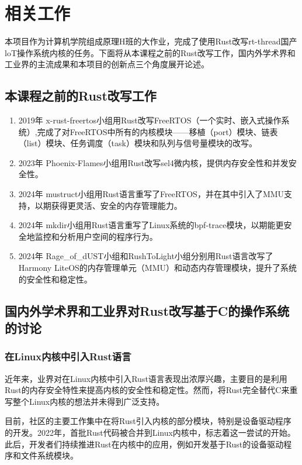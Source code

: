 \section{相关工作}

本项目作为计算机学院组成原理H班的大作业，完成了使用Rust改写rt-thread国产loT操作系统内核的任务。下面将从本课程之前的Rust改写工作，国内外学术界和工业界的主流成果和本项目的创新点三个角度展开论述。

\subsection{本课程之前的Rust改写工作}

\begin{enumerate}
  \item 2019年 x-rust-freertos小组用Rust改写FreeRTOS（一个实时、嵌入式操作系统）,完成了对FreeRTOS中所有的内核模块——移植（port）模块、链表（list）模块、任务调度（task）模块和队列与信号量模块的改写。
  \item 2023年 Phoenix-Flames小组用Rust改写sel4微内核，提供内存安全性和并发安全性。
  \item 2024年 mustruct小组用Rust语言重写了FreeRTOS，并在其中引入了MMU支持，以期获得更灵活、安全的内存管理能力。
  \item 2024年 mkdir小组用Rust语言重写了Linux系统的bpf-trace模块，以期能更安全地监控和分析用户空间的程序行为。
  \item 2024年 Rage\_of\_dUST小组和RushToLight小组分别用Rust语言改写了Harmony LiteOS的内存管理单元（MMU）和动态内存管理模块，提升了系统的安全性和稳定性。
\end{enumerate}

\subsection{国内外学术界和工业界对Rust改写基于C的操作系统的讨论}

\subsubsection{在Linux内核中引入Rust语言}

近年来，业界对在Linux内核中引入Rust语言表现出浓厚兴趣，主要目的是利用Rust的内存安全特性来提高内核的安全性和稳定性。然而，将Rust完全替代C来重写整个Linux内核的想法并未得到广泛支持。

目前，社区的主要工作集中在将Rust引入内核的部分模块，特别是设备驱动程序的开发。2022年，首批Rust代码被合并到Linux内核中，标志着这一尝试的开始。此后，开发者们持续推进Rust在内核中的应用，例如开发基于Rust的设备驱动程序和文件系统模块。

